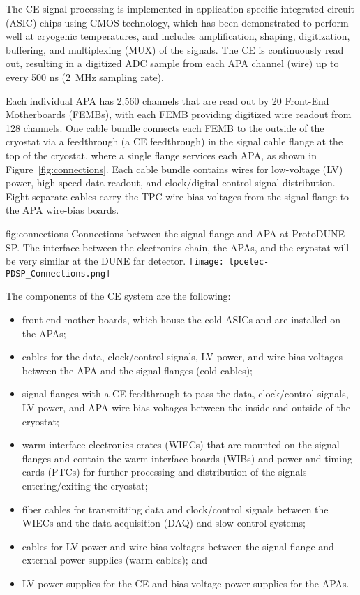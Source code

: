 The CE signal processing is implemented in application-specific integrated circuit (ASIC) chips
using CMOS technology, which has been
demonstrated to perform well at cryogenic temperatures, and includes amplification, shaping,
digitization, buffering, and multiplexing (MUX) of the signals.  The CE is continuously read out,
resulting in a digitized ADC sample from each APA channel (wire) up to every 500 ns (2~MHz sampling
rate).

Each individual APA has 2,560 channels that are read out by 20 Front-End Motherboards (FEMBs), with
each FEMB providing digitized wire readout from 128 channels.  One cable bundle connects each FEMB to
the outside of the cryostat via a feedthrough (a CE feedthrough) in the signal cable flange at the
top of the cryostat, where a single flange services each APA, as shown in Figure~\ref{fig:connections}.
Each cable bundle contains wires for low-voltage (LV) power, high-speed data readout, and
clock/digital-control signal distribution.  Eight separate cables carry the TPC wire-bias voltages
from the signal flange to the APA wire-bias boards.

\begin{dunefigure}
{fig:connections}
{Connections between the signal flange and APA at ProtoDUNE-SP.  The interface between the electronics chain, the APAs, and the cryostat will be very similar at the DUNE far detector.}
\texttt{[image: tpcelec-PDSP\_Connections.png]}
\end{dunefigure}

The components of the CE system are the following:
\begin{itemize}
\item{front-end mother boards, which house the cold ASICs and are installed on the
APAs;}
\item{cables for the data, clock/control signals, LV power, and wire-bias voltages between the APA and the signal flanges (cold cables);}
\item{signal flanges with a CE feedthrough to pass the data, clock/control signals, LV power, and APA wire-bias voltages between the inside and outside of the cryostat;}
\item{warm interface electronics crates (WIECs) that are mounted on the signal flanges and contain
the warm interface boards (WIBs) and power and timing cards (PTCs) for further processing
and distribution of the signals entering/exiting the cryostat;}
\item{fiber cables for transmitting data and clock/control signals between the WIECs and the
data acquisition (DAQ) and slow control systems;}
\item{cables for LV power and wire-bias voltages between the signal flange and external power
supplies (warm cables); and}
\item{LV power supplies for the CE and bias-voltage power supplies for the APAs.}
\end{itemize}

